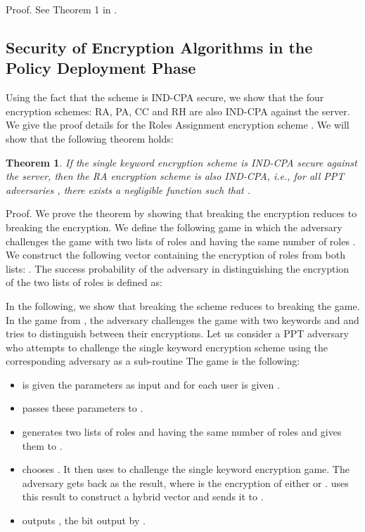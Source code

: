 \documentclass[final,5p,times,twocolumn]{elsarticle}
\newtheorem{theorem}{Theorem}
\begin{document}
Proof. See Theorem 1 in \cite{Dong2011}.

\subsection{Security of Encryption Algorithms in the Policy Deployment Phase}
Using the fact that the  scheme is IND-CPA secure, we show that the four encryption schemes: RA, PA, CC and RH are also IND-CPA against the server. We give the proof details for the Roles Assignment encryption scheme . We will show that the following theorem holds:

\begin{theorem}
If the single keyword encryption  scheme is IND-CPA secure against the server, then the RA encryption scheme  is also IND-CPA, i.e., for all PPT adversaries , there exists a negligible function  such that
.
\end{theorem}

Proof. We prove the theorem by showing that breaking the  encryption reduces to breaking the  encryption. We define the following game in which the adversary  challenges the game with two lists of roles  and  having the same number of roles . We construct the following vector containing the encryption of roles from both lists: . The success probability of the adversary in distinguishing the encryption of the two lists of roles is defined as:



In the following, we show that breaking the  scheme reduces to breaking the  game. In the  game from \cite{Dong2011}, the adversary challenges the game with two keywords  and  and tries to distinguish between their encryptions. Let us consider a PPT adversary  who attempts to challenge the single keyword encryption scheme  using the corresponding  adversary  as a sub-routine The game is the following:
\begin{itemize}
\item  is given the parameters  as input and for each user  is given .
\item  passes these parameters to .
\item  generates two lists of roles  and  having the same number of roles   and gives them to .
\item  chooses . It then uses  to challenge the single keyword encryption  game. The adversary gets back  as the result, where  is the encryption of either  or .  uses this result to construct a hybrid vector  and sends it to .
\item  outputs , the bit output by .
\end{itemize}
\end{document}
